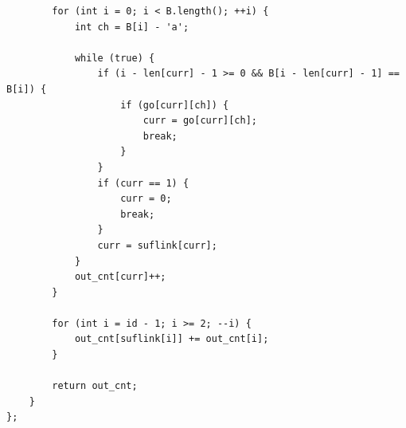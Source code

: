 \documentclass[9pt,a4paper,twocolumn]{extarticle}
\begin{document}
\begin{lstlisting}
        for (int i = 0; i < B.length(); ++i) {
            int ch = B[i] - 'a';

            while (true) {
                if (i - len[curr] - 1 >= 0 && B[i - len[curr] - 1] == B[i]) {
                    if (go[curr][ch]) {
                        curr = go[curr][ch];
                        break;
                    }
                }
                if (curr == 1) {
                    curr = 0;
                    break;
                }
                curr = suflink[curr];
            }
            out_cnt[curr]++;
        }

        for (int i = id - 1; i >= 2; --i) {
            out_cnt[suflink[i]] += out_cnt[i];
        }

        return out_cnt;
    }
};
\end{lstlisting}

\filbreak
\end{document}
